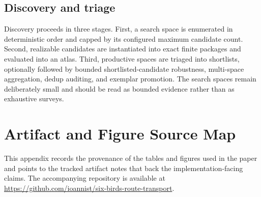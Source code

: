 \documentclass[11pt]{article}
\theoremstyle{definition}
\begin{document}
\subsection{Discovery and triage}\label{appsubsec:comp-discovery}
Discovery proceeds in three stages. First, a search space is enumerated in deterministic order and capped by its configured maximum candidate count. Second, realizable candidates are instantiated into exact finite packages and evaluated into an atlas. Third, productive spaces are triaged into shortlists, optionally followed by bounded shortlisted-candidate robustness, multi-space aggregation, dedup auditing, and exemplar promotion. The search spaces remain deliberately small and should be read as bounded evidence rather than as exhaustive surveys.

\section{Artifact and Figure Source Map}\label{app:artifact-map}
This appendix records the provenance of the tables and figures used in the paper and points to the tracked artifact notes that back the implementation-facing claims. The accompanying repository is available at \url{https://github.com/ioannist/six-birds-route-transport}.
\end{document}
